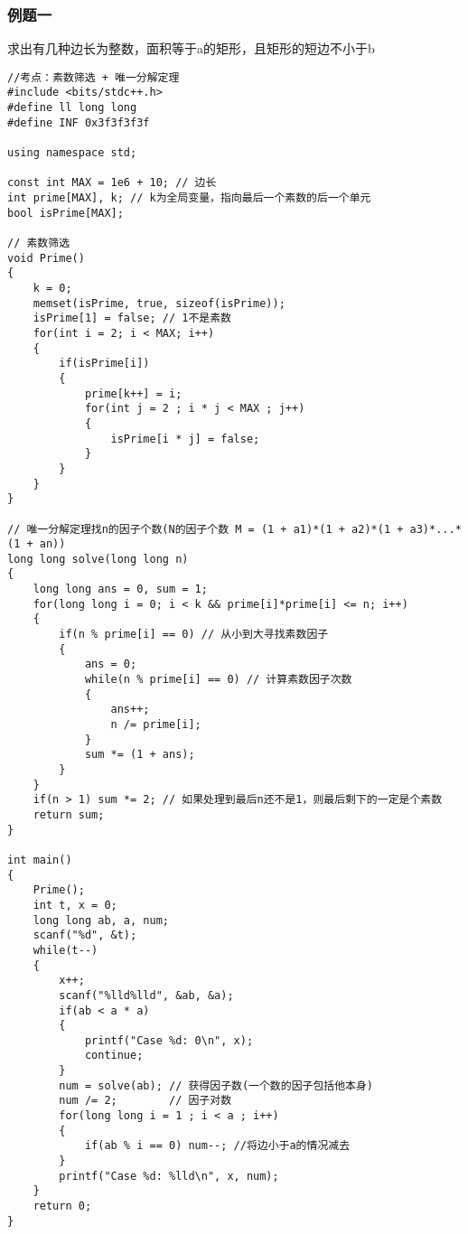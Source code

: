 \subsubsection{例题一}
求出有几种边长为整数，面积等于a的矩形，且矩形的短边不小于b
\begin{lstlisting}
//考点：素数筛选 + 唯一分解定理
#include <bits/stdc++.h>
#define ll long long
#define INF 0x3f3f3f3f

using namespace std;

const int MAX = 1e6 + 10; // 边长
int prime[MAX], k; // k为全局变量，指向最后一个素数的后一个单元
bool isPrime[MAX];

// 素数筛选
void Prime()
{
	k = 0;
	memset(isPrime, true, sizeof(isPrime));
	isPrime[1] = false; // 1不是素数
	for(int i = 2; i < MAX; i++)
	{
		if(isPrime[i])
		{
			prime[k++] = i;
			for(int j = 2 ; i * j < MAX ; j++)
			{
				isPrime[i * j] = false;
			}
		}
	}
}

// 唯一分解定理找n的因子个数(N的因子个数 M = (1 + a1)*(1 + a2)*(1 + a3)*...*(1 + an))
long long solve(long long n)
{
	long long ans = 0, sum = 1;
	for(long long i = 0; i < k && prime[i]*prime[i] <= n; i++)
	{
		if(n % prime[i] == 0) // 从小到大寻找素数因子
		{
			ans = 0;
			while(n % prime[i] == 0) // 计算素数因子次数
			{
				ans++;
				n /= prime[i];
			}
			sum *= (1 + ans);
		}
	}
	if(n > 1) sum *= 2; // 如果处理到最后n还不是1，则最后剩下的一定是个素数
	return sum;
}

int main()
{
	Prime();
	int t, x = 0;
	long long ab, a, num;
	scanf("%d", &t);
	while(t--)
	{
		x++;
		scanf("%lld%lld", &ab, &a);
		if(ab < a * a)
		{
			printf("Case %d: 0\n", x);
			continue;
		}
		num = solve(ab); // 获得因子数(一个数的因子包括他本身)
		num /= 2;        // 因子对数
		for(long long i = 1 ; i < a ; i++)
		{
			if(ab % i == 0) num--; //将边小于a的情况减去
		}
		printf("Case %d: %lld\n", x, num);
	}
	return 0;
}
\end{lstlisting}

